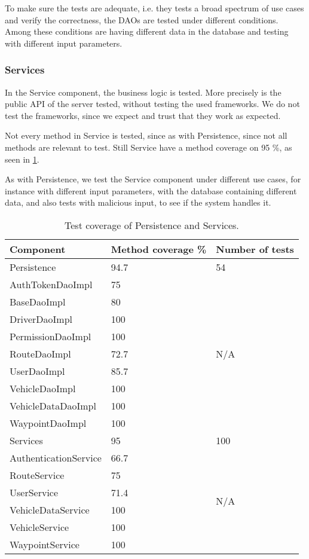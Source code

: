 To make sure the tests are adequate, i.e. they tests a broad spectrum of use cases and verify the correctness,
the \acp{DAO} are tested under different conditions.
Among these conditions are having different data in the database and testing with different input parameters.

\subsubsection{Services}
In the Service component, the business logic is tested.
More precisely is the public \ac{API} of the server tested, without testing the used frameworks.
We do not test the frameworks, since we expect and trust that they work as expected.

Not every method in Service is tested, since as with Persistence, since not all methods are relevant to test.
Still Service have a method coverage on 95 \%, as seen in \cref{tab:test_cov}.

As with Persistence, we test the Service component under different use cases, for instance with different input parameters,
with the database containing different data, and also tests with malicious input, to see if the system handles it.

\begin{table}
    \center
    \begin{tabular}{l|l|l}
        \textbf{Component}      & \textbf{Method coverage \%} & \textbf{Number of tests} \\
        \toprule
        Persistence             & 94.7  & 54 \\
        \toprule
        AuthTokenDaoImpl        & 75    & \multirow{9}{*}{N/A} \\
        BaseDaoImpl             & 80    & \\
        DriverDaoImpl           & 100   & \\
        PermissionDaoImpl       & 100   & \\
        RouteDaoImpl            & 72.7  & \\
        UserDaoImpl             & 85.7  & \\
        VehicleDaoImpl          & 100   & \\
        VehicleDataDaoImpl      & 100   & \\
        WaypointDaoImpl         & 100   & \\
        \midrule
        Services                & 95    & 100 \\
        \toprule
        AuthenticationService   & 66.7  & \multirow{6}{*}{N/A} \\
        RouteService            & 75    & \\
        UserService             & 71.4  & \\
        VehicleDataService      & 100   & \\
        VehicleService          & 100   & \\
        WaypointService         & 100   & \\
        \bottomrule
    \end{tabular}
    \caption{Test coverage of Persistence and Services.}\label{tab:test_cov}
\end{table}
